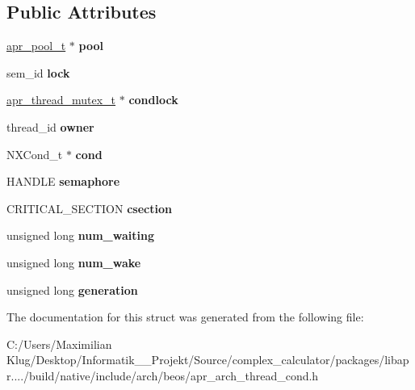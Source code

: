 \subsection*{Public Attributes}
\begin{DoxyCompactItemize}
\item 
\mbox{\label{structapr__thread__cond__t_a9acc87c02ac47f686e8ac08bc54e342c}} 
\mbox{\hyperlink{group__apr__pools_gaf137f28edcf9a086cd6bc36c20d7cdfb}{apr\+\_\+pool\+\_\+t}} $\ast$ {\bfseries pool}
\item 
\mbox{\label{structapr__thread__cond__t_a38b58aa41283eb7a3bfca1e27851d191}} 
sem\+\_\+id {\bfseries lock}
\item 
\mbox{\label{structapr__thread__cond__t_aa1e52ba4fcce1d25fb9bd4010a962aa9}} 
\mbox{\hyperlink{structapr__thread__mutex__t}{apr\+\_\+thread\+\_\+mutex\+\_\+t}} $\ast$ {\bfseries condlock}
\item 
\mbox{\label{structapr__thread__cond__t_a2e81addb219b81eb7a10800885a6d79b}} 
thread\+\_\+id {\bfseries owner}
\item 
\mbox{\label{structapr__thread__cond__t_a335a998871670b3a49e717da3ca0e7b4}} 
N\+X\+Cond\+\_\+t $\ast$ {\bfseries cond}
\item 
\mbox{\label{structapr__thread__cond__t_a9351e58b30537e3a784a2614e25f503a}} 
H\+A\+N\+D\+LE {\bfseries semaphore}
\item 
\mbox{\label{structapr__thread__cond__t_ac3e75412c3e2e48abb838e67580f5795}} 
C\+R\+I\+T\+I\+C\+A\+L\+\_\+\+S\+E\+C\+T\+I\+ON {\bfseries csection}
\item 
\mbox{\label{structapr__thread__cond__t_a11fa71f2dc049089bc54d209a4a73416}} 
unsigned long {\bfseries num\+\_\+waiting}
\item 
\mbox{\label{structapr__thread__cond__t_a19a1c7aa4e00c9c9ed39784426ceac7f}} 
unsigned long {\bfseries num\+\_\+wake}
\item 
\mbox{\label{structapr__thread__cond__t_a149ed22fd09a2b0e196afa6f4a9514d0}} 
unsigned long {\bfseries generation}
\end{DoxyCompactItemize}


The documentation for this struct was generated from the following file\+:\begin{DoxyCompactItemize}
\item 
C\+:/\+Users/\+Maximilian Klug/\+Desktop/\+Informatik\+\_\+\_\+\+Projekt/\+Source/complex\+\_\+calculator/packages/libapr..../build/native/include/arch/beos/apr\+\_\+arch\+\_\+thread\+\_\+cond.\+h\end{DoxyCompactItemize}
